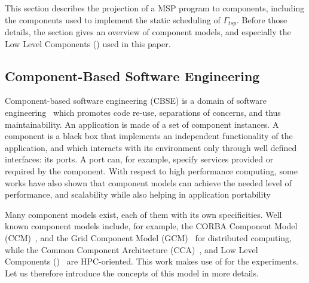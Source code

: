 This section describes the projection of a MSP program to components, including the components used to implement the static scheduling of $\Gamma_{tsp}$.
Before those details, the section gives an overview of component models, and especially the Low Level Components (\llc) used in this paper.


\subsection{Component-Based Software Engineering}
Component-based software engineering (CBSE) is a domain of software engineering~\cite{Szyperski:2002:CSB:515228} which promotes code
re-use, separations of concerns, and thus maintainability.
An application is made of a set of component instances.
A component is a black box that implements an independent functionality of the application, and which interacts with its environment only through well defined interfaces: its ports.
A port can, for example, specify services provided or required by the component.
With respect to high performance computing, some works have also shown
that component models can achieve the needed level of performance, and
scalability while also helping in application
portability~\cite{Bernholdt01052006, bigot:inria-00388508, UCHPC2015}

Many component models exist, each of them with its own specificities.
Well known component models include, for example, the CORBA Component Model (CCM)~\cite{corba:omg06}, and the Grid Component Model (GCM)~\cite{Baude} for distributed computing, while the Common Component Architecture (CCA)~\cite{Bernholdt01052006}, and Low Level Components (\llc)~\cite{l2c} are HPC-oriented.
This work makes use of \llc for the experiments.
Let us therefore introduce the concepts of this model in more details.

\subsection{\llc}

